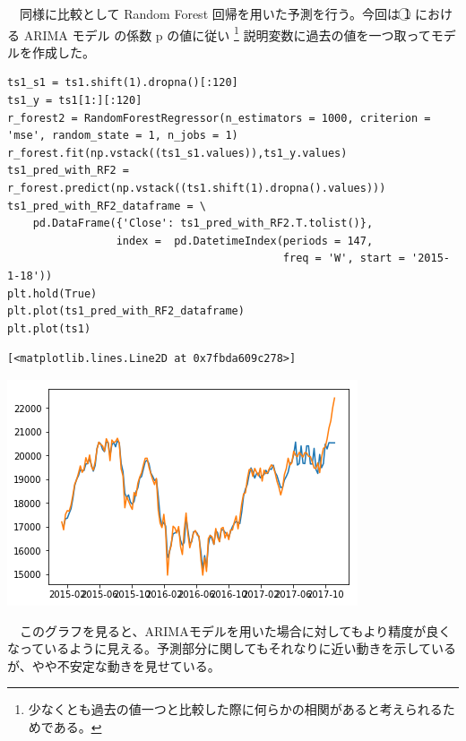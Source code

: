 \documentclass{scrartcl}
\begin{document}
　同様に比較として Random Forest 回帰を用いた予測を行う。今回は \textcircled{\scriptsize 1} における ARIMA モデル の係数 p の値に従い \footnote{少なくとも過去の値一つと比較した際に何らかの相関があると考えられるためである。} 説明変数に過去の値を一つ取ってモデルを作成した。\\

\begin{verbatim}
ts1_s1 = ts1.shift(1).dropna()[:120]
ts1_y = ts1[1:][:120]
r_forest2 = RandomForestRegressor(n_estimators = 1000, criterion = 'mse', random_state = 1, n_jobs = 1)
r_forest.fit(np.vstack((ts1_s1.values)),ts1_y.values)
ts1_pred_with_RF2 = r_forest.predict(np.vstack((ts1.shift(1).dropna().values)))
ts1_pred_with_RF2_dataframe = \
    pd.DataFrame({'Close': ts1_pred_with_RF2.T.tolist()},
                 index =  pd.DatetimeIndex(periods = 147,
                                           freq = 'W', start = '2015-1-18'))
plt.hold(True)
plt.plot(ts1_pred_with_RF2_dataframe)
plt.plot(ts1)
\end{verbatim}

\begin{verbatim}
[<matplotlib.lines.Line2D at 0x7fbda609c278>]
\end{verbatim}
\begin{center}
\includegraphics[width=.9\linewidth]{./obipy-resources/YbLLZi.png}
\end{center}

　このグラフを見ると、ARIMAモデルを用いた場合に対してもより精度が良くなっているように見える。予測部分に関してもそれなりに近い動きを示しているが、やや不安定な動きを見せている。\\
\end{document}
